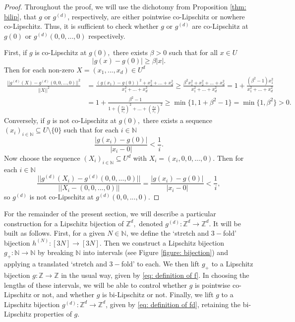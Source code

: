 \documentclass{article}
\newcommand{\Z}{\mathbb{Z}}
\newcommand{\N}{\mathbb{N}}
\begin{document}
\begin{proof} Throughout the proof, we will use the dichotomy from Proposition \ref{thm: bilip}, that $g$ or $g^{(d)}$, respectively, are either pointwise co-Lipschitz or nowhere co-Lipschitz. Thus, it is sufficient to check whether $g$ or $g^{(d)}$ are co-Lipschitz at $g(0)$ or $g^{(d)}(0,0,...,0)$ respectively.

    First, if $g$ is co-Lipschitz at $g(0),$ there exists $\beta>0$ such that for all $x \in U$
    $${|g(x)-g(0)|}\geq \beta|x|.$$
    Then for each non-zero $X = (x_1,...,x_d) \in U^d$
    \begin{equation*}
        \begin{split}
            \frac{||g^{(d)}(X)-g^{(d)}(0,0,...,0)||^2}{||X||^2} &= \frac{(g(x_1)-g(0))^2+x_2^2+...+x_d^2}{x_1^2+...+x_d^2} \geq \frac{\beta^2x_1^2+x_2^2+...+x_d^2}{x_1^2+...+x_d^2} = 1+\frac{(\beta^2-1)x_1^2}{x_1^2+...+x_d^2}\\&= 1+\frac{\beta^2-1}{1+(\frac{x_2}{x_1})^2+...+(\frac{x_d}{x_1})^2}\geq \min\{1,1+{\beta^2-1}\}=\min\{1,\beta^2\}>0.
        \end{split}
    \end{equation*}
    Conversely, if $g$ is not co-Lipschitz at $g(0),$ there exists a sequence $(x_i)_{i \in \N} \subseteq U\setminus \{0\}$ such that for each $i \in \N$
    $$\frac{|g(x_i)-g(0)|}{|x_i-0|}<\frac{1}{i}.$$
Now choose the sequence $(X_i)_{i \in \N} \subseteq U^d$ with
$X_i = (x_i,0,0,...,0).$
Then for each $i \in \N$
$$\frac{||g^{(d)}(X_i) - g^{(d)}(0,0,...,0)||}{||X_i - (0,0,...,0)||} = \frac{|g(x_i)-g(0)|}{|x_i-0|}<\frac{1}{i},$$
so $g^{(d)}$ is not co-Lipschitz at $g^{(d)}(0,0,...,0).$
\end{proof} 

For the remainder of the present section, we will describe a particular construction for a Lipschitz bijection of $\Z^d,$ denoted $g^{(d)}:\Z^d \to \Z^d.$ It will be built as follows. First, for a given $N \in \N$, we define the `stretch and $3-$fold' bijection $h^{(N)}:[3N] \to [3N].$ Then we construct a Lipschitz bijection $g_+:\N \to \N$ by breaking $\N$ into intervals (see Figure \ref{figure: bijection}) and applying a translated `stretch and $3-$fold' to each. We then lift $g_+$ to a Lipschitz bijection $g:\Z \to \Z$ in the usual way, given by \eqref{eq: definition of f}. In choosing the lengths of these intervals, we will be able to control whether $g$ is pointwise co-Lipschitz or not, and whether $g$ is bi-Lipschitz or not. Finally, we lift $g$ to a Lipschitz bijection $g^{(d)}:\Z^d \to \Z^d$, given by \eqref{eq: definition of fd}, retaining the bi-Lipschitz properties of $g.$
\end{document}
